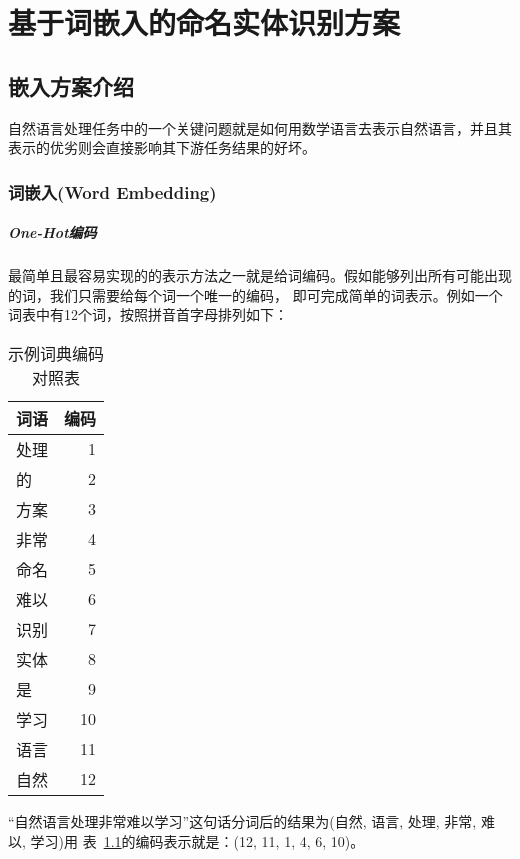

\chapter{基于词嵌入的命名实体识别方案}

\section{嵌入方案介绍}

自然语言处理任务中的一个关键问题就是如何用数学语言去表示自然语言，并且其表示的优劣则会直接影响其下游任务结果的好坏。

\subsection{词嵌入(Word Embedding)}

\paragraph{One-Hot编码}
最简单且最容易实现的的表示方法之一就是给词编码。假如能够列出所有可能出现的词，我们只需要给每个词一个唯一的编码，
即可完成简单的词表示。例如一个词表中有12个词，按照拼音首字母排列如下：

\begin{table}[!hpt]
    \caption[示例词典编码对照表]{示例词典编码对照表}
    \label{tab:case_lookup_table}
    \centering
    \begin{tabular}{lr} \toprule
      词语  &   编码 \\ \midrule
      处理  &   1 \\
      的    &   2 \\
      方案  &   3 \\
      非常  &   4 \\
      命名  &   5 \\
      难以  &   6 \\
      识别  &   7 \\
      实体  &   8 \\
      是    &   9 \\
      学习  &   10 \\
      语言  &   11 \\
      自然  &   12 \\ \bottomrule
    \end{tabular}
\end{table}

“自然语言处理非常难以学习”这句话分词后的结果为(自然, 语言, 处理, 非常, 难以, 学习)用
表~\ref{tab:case_lookup_table}的编码表示就是：(12, 11, 1, 4, 6, 10)。

